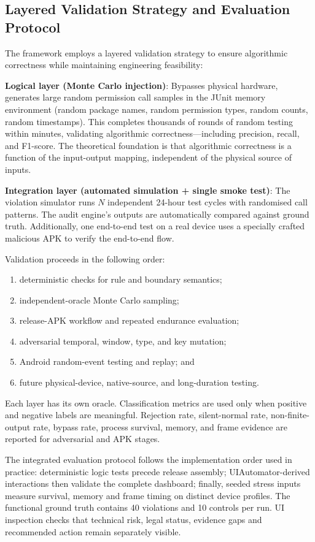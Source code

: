 \subsection{Layered Validation Strategy and Evaluation Protocol}

The framework employs a layered validation strategy to ensure algorithmic correctness while maintaining engineering feasibility:

\textbf{Logical layer (Monte Carlo injection)}: Bypasses physical hardware, generates large random permission call samples in the JUnit memory environment (random package names, random permission types, random counts, random timestamps). This completes thousands of rounds of random testing within minutes, validating algorithmic correctness—including precision, recall, and F1-score. The theoretical foundation is that algorithmic correctness is a function of the input-output mapping, independent of the physical source of inputs.

\textbf{Integration layer (automated simulation + single smoke test)}: The violation simulator runs $N$ independent 24-hour test cycles with randomised call patterns. The audit engine's outputs are automatically compared against ground truth. Additionally, one end-to-end test on a real device uses a specially crafted malicious APK to verify the end-to-end flow.

Validation proceeds in the following order:
\begin{enumerate}
\item deterministic checks for rule and boundary semantics;
\item independent-oracle Monte Carlo sampling;
\item release-APK workflow and repeated endurance evaluation;
\item adversarial temporal, window, type, and key mutation;
\item Android random-event testing and replay; and
\item future physical-device, native-source, and long-duration testing.
\end{enumerate}

Each layer has its own oracle. Classification metrics are used only when positive and negative labels are meaningful. Rejection rate, silent-normal rate, non-finite-output rate, bypass rate, process survival, memory, and frame evidence are reported for adversarial and APK stages.

The integrated evaluation protocol follows the implementation order used in practice: deterministic logic tests precede release assembly; UIAutomator-derived interactions then validate the complete dashboard; finally, seeded stress inputs measure survival, memory and frame timing on distinct device profiles. The functional ground truth contains 40 violations and 10 controls per run. UI inspection checks that technical risk, legal status, evidence gaps and recommended action remain separately visible.

